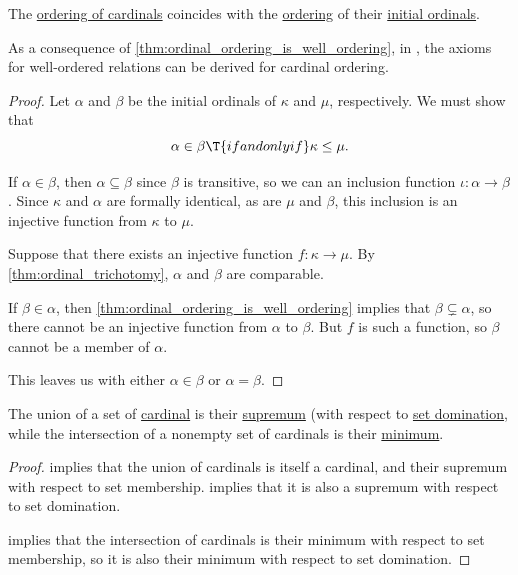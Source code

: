 \begin{proposition}\label{thm:cardinal_ordering_compatibility}
  The \hyperref[def:cardinal_ordering]{ordering of cardinals} coincides with the \hyperref[def:ordinal_ordering]{ordering} of their \hyperref[def:initial_ordinal]{initial ordinals}.
\end{proposition}
\begin{comments}
  \item As a consequence of \cref{thm:ordinal_ordering_is_well_ordering}, in \hyperref[def:zfc]{}, the axioms for well-ordered relations can be derived for cardinal ordering.
\end{comments}
\begin{proof}
  Let \( \alpha \) and \( \beta \) be the initial ordinals of \( \kappa \) and \( \mu \), respectively. We must show that
  \begin{equation*}
    \alpha \in \beta \T{if and only if} \kappa \leq \mu.
  \end{equation*}

  \SufficiencySubProof If \( \alpha \in \beta \), then \( \alpha \subseteq \beta \) since \( \beta \) is transitive, so we can an inclusion function \( \iota: \alpha \to \beta \). Since \( \kappa \) and \( \alpha \) are formally identical, as are \( \mu \) and \( \beta \), this inclusion is an injective function from \( \kappa \) to \( \mu \).

  \NecessitySubProof Suppose that there exists an injective function \( f: \kappa \to \mu \). By \cref{thm:ordinal_trichotomy}, \( \alpha \) and \( \beta \) are comparable.

  If \( \beta \in \alpha \), then \cref{thm:ordinal_ordering_is_well_ordering} implies that \( \beta \subsetneq \alpha \), so there cannot be an injective function from \( \alpha \) to \( \beta \). But \( f \) is such a function, so \( \beta \) cannot be a member of \( \alpha \).

  This leaves us with either \( \alpha \in \beta \) or \( \alpha = \beta \).
\end{proof}

\begin{corollary}\label{thm:lattice_of_cardinals}
  The union of a set of \hyperref[def:cardinal]{cardinal} is their \hyperref[def:extremal_points/supremum_and_infimum]{supremum} (with respect to \hyperref[def:set_domination]{set domination}, while the intersection of a nonempty set of cardinals is their \hyperref[def:extremal_points/maximal_and_minimal_element]{minimum}.
\end{corollary}
\begin{proof}
   implies that the union of cardinals is itself a cardinal, and their supremum with respect to set membership.  implies that it is also a supremum with respect to set domination.

   implies that the intersection of cardinals is their minimum with respect to set membership, so it is also their minimum with respect to set domination.
\end{proof}

